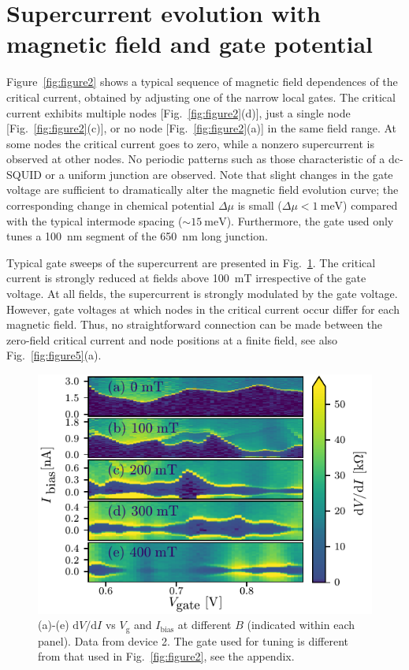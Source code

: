 \section{Supercurrent evolution with magnetic field and gate potential}
Figure~\ref{fig:figure2} shows a typical sequence of magnetic field dependences of the critical current, obtained by adjusting one of the narrow local gates.
The critical current exhibits multiple nodes [Fig.~\ref{fig:figure2}(d)], just a single node [Fig.~\ref{fig:figure2}(c)], or no node [Fig.~\ref{fig:figure2}(a)] in the same field range.
At some nodes the critical current goes to zero, while a nonzero supercurrent is observed at other nodes.
No periodic patterns such as those characteristic of a dc-SQUID or a uniform junction are observed.
Note that slight changes in the gate voltage are sufficient to dramatically alter the magnetic field evolution curve; the corresponding change in chemical potential $\Delta \mu$ is small ($\Delta \mu < \SI{1}{\milli \electronvolt}$) compared with the typical intermode spacing ($\sim \SI{15}{\milli \electronvolt}$).
Furthermore, the gate used only tunes a \SI{100}{\nano \meter} segment of the \SI{650}{\nano \meter} long junction.

Typical gate sweeps of the supercurrent are presented in Fig.~\ref{fig:figure3}.
The critical current is strongly reduced at fields above \SI{100}{\milli \tesla} irrespective of the gate voltage.
At all fields, the supercurrent is strongly modulated by the gate voltage.
However, gate voltages at which nodes in the critical current occur differ for each magnetic field.
Thus, no straightforward connection can be made between the zero-field critical current and node positions at a finite field, see also Fig.~\ref{fig:figure5}(a).

\begin{figure}
\begin{center}
\includegraphics[width=0.7\columnwidth]{chapter_supercurrent/figures/fig3.pdf}
\caption{(a)-(e) $\mathrm{d}V/\mathrm{d}I$ vs $V_\mathrm{g}$ and $I_\mathrm{bias}$ at different $B$ (indicated within each panel).
Data from device 2.
The gate used for tuning is different from that used in Fig.~\ref{fig:figure2}, see the appendix.
\label{fig:figure3}}
\end{center}
\end{figure}

